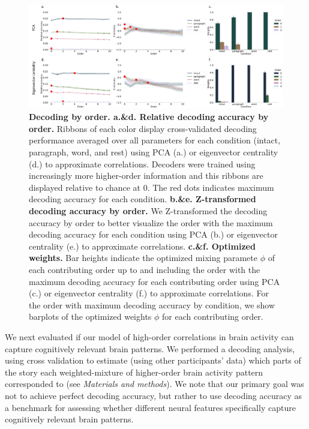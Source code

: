 \documentclass[english]{article}
\begin{document}
\begin{figure}
  \centering
  \includegraphics[width=\textwidth]{figs/decode_level.pdf}
  \caption{\textbf{Decoding by order.
      a.\&d. Relative decoding accuracy by order.} Ribbons of each
    color display cross-validated decoding performance averaged over
    all parameters for each condition (intact, paragraph, word,
    and rest) using PCA (a.) or eigenvector centrality (d.) to
    approximate correlations. Decoders were trained using increasingly more
    higher-order information and this ribbons are displayed relative
    to chance at 0. The red dots indicates
    maximum decoding accuracy for each condition. \textbf{b.\&e. Z-transformed decoding accuracy
      by order.}  We Z-transformed the decoding accuracy by order to better
    visualize the order with the maximum decoding accuracy for each
    condition using PCA (b.) or eigenvector centrality (e.) to
    approximate correlations. \textbf{c.\&f. Optimized weights.} Bar heights indicate the
    optimized mixing paramete $\phi$ of each contributing order up to
    and including the order with the maximum
    decoding accuracy for each contributing order using PCA (c.) or eigenvector centrality (f.) to
    approximate correlations.
  For the order with maximum decoding accuracy by condition, we show
  barplots of the optimized weights $\phi$  for each contributing
  order.}
  \label{fig:decoding_level}
\end{figure}


We next evaluated if our model of high-order correlations in brain activity can capture cognitively relevant brain patterns. We performed a decoding analysis, using cross validation to estimate (using other participants’ data) which parts of the story each weighted-mixture of higher-order brain activity pattern corresponded to (see \textit{Materials and methods}). We note that our primary goal was not to achieve perfect decoding accuracy, but rather to use decoding accuracy as a benchmark for assessing whether different neural features specifically capture cognitively relevant brain patterns.
\end{document}
